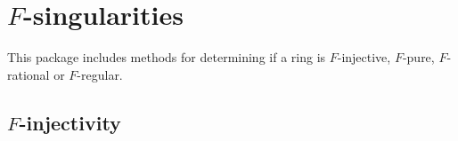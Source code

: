 \documentclass{amsart}
\begin{document}







\section{$F$-singularities}\label{Section: F-singularities}

This package includes methods for determining if a ring is $F$-injective, $F$-pure, $F$-rational or $F$-regular.

\subsection{$F$-injectivity}
\end{document}
